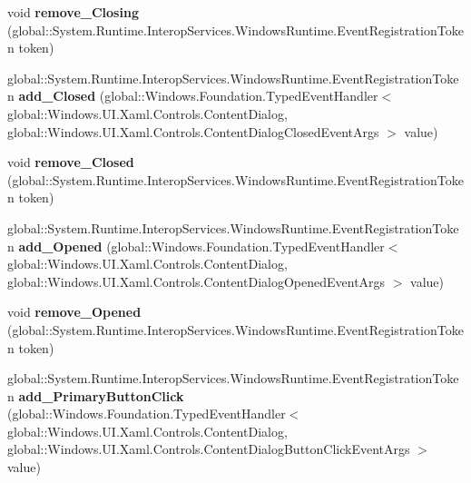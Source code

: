 \begin{DoxyCompactItemize}
void {\bfseries remove\+\_\+\+Closing} (global\+::\+System.\+Runtime.\+Interop\+Services.\+Windows\+Runtime.\+Event\+Registration\+Token token)
\item 
\mbox{\label{interface_windows_1_1_u_i_1_1_xaml_1_1_controls_1_1_i_content_dialog_a0beaba38f02c9d4794fb77352515c019}} 
global\+::\+System.\+Runtime.\+Interop\+Services.\+Windows\+Runtime.\+Event\+Registration\+Token {\bfseries add\+\_\+\+Closed} (global\+::\+Windows.\+Foundation.\+Typed\+Event\+Handler$<$ global\+::\+Windows.\+U\+I.\+Xaml.\+Controls.\+Content\+Dialog, global\+::\+Windows.\+U\+I.\+Xaml.\+Controls.\+Content\+Dialog\+Closed\+Event\+Args $>$ value)
\item 
\mbox{\label{interface_windows_1_1_u_i_1_1_xaml_1_1_controls_1_1_i_content_dialog_a0f292cccc855269673def1275049e487}} 
void {\bfseries remove\+\_\+\+Closed} (global\+::\+System.\+Runtime.\+Interop\+Services.\+Windows\+Runtime.\+Event\+Registration\+Token token)
\item 
\mbox{\label{interface_windows_1_1_u_i_1_1_xaml_1_1_controls_1_1_i_content_dialog_aab9c98aeae39301ee05dd02009bff07b}} 
global\+::\+System.\+Runtime.\+Interop\+Services.\+Windows\+Runtime.\+Event\+Registration\+Token {\bfseries add\+\_\+\+Opened} (global\+::\+Windows.\+Foundation.\+Typed\+Event\+Handler$<$ global\+::\+Windows.\+U\+I.\+Xaml.\+Controls.\+Content\+Dialog, global\+::\+Windows.\+U\+I.\+Xaml.\+Controls.\+Content\+Dialog\+Opened\+Event\+Args $>$ value)
\item 
\mbox{\label{interface_windows_1_1_u_i_1_1_xaml_1_1_controls_1_1_i_content_dialog_ad3492a494e11fd90309979866a567dfb}} 
void {\bfseries remove\+\_\+\+Opened} (global\+::\+System.\+Runtime.\+Interop\+Services.\+Windows\+Runtime.\+Event\+Registration\+Token token)
\item 
\mbox{\label{interface_windows_1_1_u_i_1_1_xaml_1_1_controls_1_1_i_content_dialog_ab6c7f4c09786d73f59362e42d3204ae4}} 
global\+::\+System.\+Runtime.\+Interop\+Services.\+Windows\+Runtime.\+Event\+Registration\+Token {\bfseries add\+\_\+\+Primary\+Button\+Click} (global\+::\+Windows.\+Foundation.\+Typed\+Event\+Handler$<$ global\+::\+Windows.\+U\+I.\+Xaml.\+Controls.\+Content\+Dialog, global\+::\+Windows.\+U\+I.\+Xaml.\+Controls.\+Content\+Dialog\+Button\+Click\+Event\+Args $>$ value)

\end{DoxyCompactItemize}
